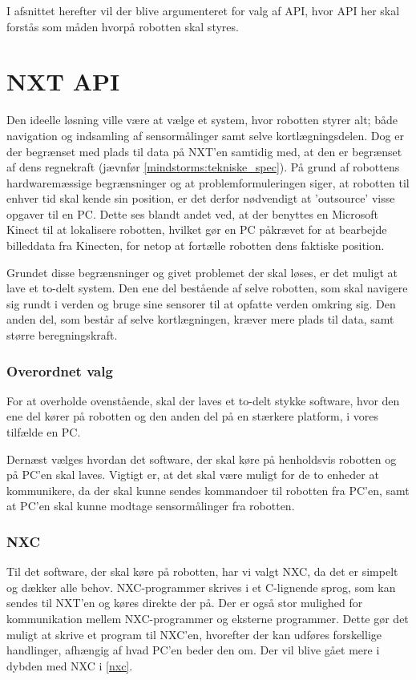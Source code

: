 I afsnittet herefter vil der blive argumenteret for valg af API, hvor API her skal forstås som måden hvorpå robotten skal styres.

\section{NXT API}\label{nxt_api}
Den ideelle løsning ville være at vælge et system, hvor robotten styrer alt; både navigation og indsamling af sensormålinger samt selve kortlægningsdelen.
Dog er der begrænset med plads til data på NXT'en samtidig med, at den er begrænset af dens regnekraft (jævnfør \cref{mindstorms:tekniske_spec}).
På grund af robottens hardwaremæssige begrænsninger og at problemformuleringen siger, at robotten til enhver tid skal kende sin position, er det derfor nødvendigt at 'outsource' visse opgaver til en PC.
Dette ses blandt andet ved, at der benyttes en Microsoft Kinect til at lokalisere robotten, hvilket gør en PC påkrævet for at bearbejde billeddata fra Kinecten, for netop at fortælle robotten dens faktiske position.

Grundet disse begrænsninger og givet problemet der skal løses, er det muligt at lave et to-delt system.
Den ene del bestående af selve robotten, som skal navigere sig rundt i verden og bruge sine sensorer til at opfatte verden omkring sig.
Den anden del, som består af selve kortlægningen, kræver mere plads til data, samt større beregningskraft.

\subsubsection*{Overordnet valg}
For at overholde ovenstående, skal der laves et to-delt stykke software, hvor den ene del kører på robotten og den anden del på en stærkere platform, i vores tilfælde en PC.

Dernæst vælges hvordan det software, der skal køre på henholdsvis robotten og på PC'en skal laves.
Vigtigt er, at det skal være muligt for de to enheder at kommunikere, da der skal kunne sendes kommandoer til robotten fra PC'en, samt at PC'en skal kunne modtage sensormålinger fra robotten.

\subsubsection*{NXC}
Til det software, der skal køre på robotten, har vi valgt NXC, da det er simpelt og dækker alle behov.
NXC-programmer skrives i et C-lignende sprog, som kan sendes til NXT'en og køres direkte der på.
Der er også stor mulighed for kommunikation mellem NXC-programmer og eksterne programmer.
Dette gør det muligt at skrive et program til NXC'en, hvorefter der kan udføres forskellige handlinger, afhængig af hvad PC'en beder den om.
Der vil blive gået mere i dybden med NXC i \cref{nxc}.

